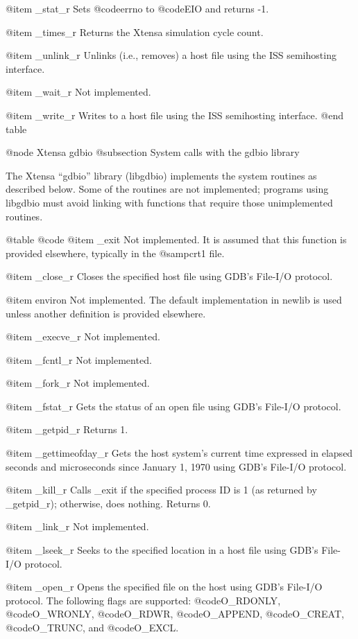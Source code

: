 @item _stat_r
Sets @code{errno} to @code{EIO} and returns -1.

@item _times_r
Returns the Xtensa simulation cycle count.

@item _unlink_r
Unlinks (i.e., removes) a host file using the ISS semihosting interface.

@item _wait_r
Not implemented.

@item _write_r
Writes to a host file using the ISS semihosting interface.
@end table

@node Xtensa gdbio
@subsection System calls with the gdbio library

The Xtensa ``gdbio'' library (libgdbio) implements the system routines as
described below.  Some of the routines are not implemented; programs using
libgdbio must avoid linking with functions that require those unimplemented
routines.

@table @code
@item _exit
Not implemented. It is assumed that this function is provided elsewhere,
typically in the @samp{crt1} file.

@item _close_r
Closes the specified host file using GDB's File-I/O protocol.

@item environ
Not implemented. The default implementation in newlib is used unless
another definition is provided elsewhere.

@item _execve_r
Not implemented.

@item _fcntl_r
Not implemented.

@item _fork_r
Not implemented.

@item _fstat_r
Gets the status of an open file using GDB's File-I/O protocol.

@item _getpid_r
Returns 1.

@item _gettimeofday_r
Gets the host system's current time expressed in elapsed seconds and
microseconds since January 1, 1970 using GDB's File-I/O protocol.

@item _kill_r
Calls _exit if the specified process ID is 1 (as returned by _getpid_r);
otherwise, does nothing. Returns 0.

@item _link_r
Not implemented.

@item _lseek_r
Seeks to the specified location in a host file using GDB's File-I/O protocol.

@item _open_r
Opens the specified file on the host using GDB's File-I/O protocol.  The
following flags are supported: @code{O_RDONLY}, @code{O_WRONLY},
@code{O_RDWR}, @code{O_APPEND}, @code{O_CREAT}, @code{O_TRUNC}, and
@code{O_EXCL}.

